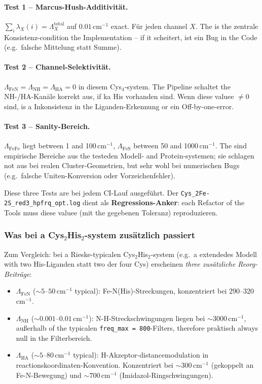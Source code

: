 \documentclass[11pt,a4paper,twoside]{article}
\theoremstyle{remark}
\begin{document}
\paragraph{Test 1 -- Marcus-Hush-Additivit\"at.}
$\sum_i \lambda_X(i) = \Lambda_X^\text{total}$ auf $0.01\,$cm$^{-1}$
exact. F\"ur jeden channel $X$. The is the zentrale
Konsistenz-condition the Implementation -- if it scheitert, ist
ein Bug in the Code (e.g.\ falsche Mittelung statt Summe).

\paragraph{Test 2 -- Channel-Selektivit\"at.}
$\Lambda_\text{FeN} = \Lambda_\text{NH} = \Lambda_\text{HA} = 0$ in
diesem Cys$_4$-system. The Pipeline schaltet the NH-/HA-Kan\"ale
korrekt aus, if ka His vorhanden sind. Wenn diese valuee $\neq 0$
sind, is a Inkonsistenz in the Liganden-Erkennung or ein
Off-by-one-error.

\paragraph{Test 3 -- Sanity-Bereich.}
$\Lambda_\text{FeFe}$ liegt between 1 and 100\,cm$^{-1}$,
$\Lambda_\text{FeS}$ between 50 and 1000\,cm$^{-1}$. The sind
empirische Bereiche aus the testeden Modell- and Protein-systemen;
sie schlagen not aus bei realen Cluster-Geometrien, but sehr
wohl bei numerischen Bugs (e.g.\ falsche Uniten-Konversion oder
Vorzeichenfehler).

Diese three Tests are bei jedem CI-Lauf ausgef\"uhrt. Der
\texttt{Cys\_2Fe-2S\_red3\_hpfrq\_opt.log} dient als
\textbf{Regressions-Anker}: each Refactor of the Tools muss diese
valuee (mit the gegebenen Toleranz) reproduzieren.

\subsubsection*{Was bei a Cys$_2$His$_2$-system zus\"atzlich passiert}

Zum Vergleich: bei a Rieske-typicalen Cys$_2$His$_2$-system
(e.g.\ a extendedes Modell with two His-Liganden statt two der
four Cys) erscheinen \emph{three zus\"atzliche Reorg-Beitr\"age}:

\begin{itemize}\setlength{\itemsep}{0pt}
  \item \textbf{$\Lambda_\text{FeN}$} ($\sim 5$--$50$\,cm$^{-1}$
        typical): Fe-N(His)-Streckungen, konzentriert bei
        290--320\,cm$^{-1}$.
  \item \textbf{$\Lambda_\text{NH}$} ($\sim 0.001$--$0.01$\,cm$^{-1}$):
        N-H-Streckschwingungen liegen bei $\sim 3000$\,cm$^{-1}$,
        au{\ss}erhalb of the typicalen \texttt{freq\_max = 800}-Filters,
        therefore praktisch always null in the Filterbereich.
  \item \textbf{$\Lambda_\text{HA}$} ($\sim 5$--$80$\,cm$^{-1}$
        typical): H-Akzeptor-distancemodulation in
        reactionskoordinaten-Konvention. Konzentriert bei
        $\sim 300$\,cm$^{-1}$ (gekoppelt an Fe-N-Bewegung) und
        $\sim 700$\,cm$^{-1}$ (Imidazol-Ringschwingungen).
\end{itemize}
\end{document}
